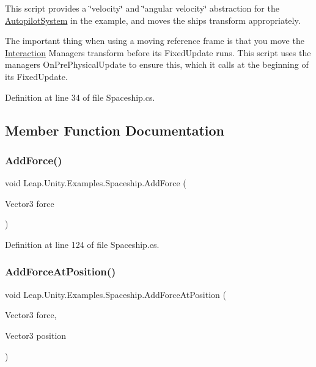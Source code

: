 This script provides a \char`\"{}velocity\char`\"{} and \char`\"{}angular velocity\char`\"{} abstraction for the \mbox{\hyperlink{class_leap_1_1_unity_1_1_examples_1_1_autopilot_system}{Autopilot\+System}} in the example, and moves the ship\textquotesingle{}s transform appropriately.

The important thing when using a moving reference frame is that you move the \mbox{\hyperlink{namespace_leap_1_1_unity_1_1_interaction}{Interaction}} Manager\textquotesingle{}s transform before its Fixed\+Update runs. This script uses the manager\textquotesingle{}s On\+Pre\+Physical\+Update to ensure this, which it calls at the beginning of its Fixed\+Update. 

Definition at line 34 of file Spaceship.\+cs.



\subsection{Member Function Documentation}
\mbox{\label{class_leap_1_1_unity_1_1_examples_1_1_spaceship_a9a263aa09c845c7a17303f7dde6c0254}} 
\subsubsection{\texorpdfstring{AddForce()}{AddForce()}}
{\footnotesize\ttfamily void Leap.\+Unity.\+Examples.\+Spaceship.\+Add\+Force (\begin{DoxyParamCaption}\item[{Vector3}]{force }\end{DoxyParamCaption})}



Definition at line 124 of file Spaceship.\+cs.

\mbox{\label{class_leap_1_1_unity_1_1_examples_1_1_spaceship_a47a880f577cb1fead6e5606acb05e456}} 
\subsubsection{\texorpdfstring{AddForceAtPosition()}{AddForceAtPosition()}}
{\footnotesize\ttfamily void Leap.\+Unity.\+Examples.\+Spaceship.\+Add\+Force\+At\+Position (\begin{DoxyParamCaption}\item[{Vector3}]{force,  }\item[{Vector3}]{position }\end{DoxyParamCaption})}



